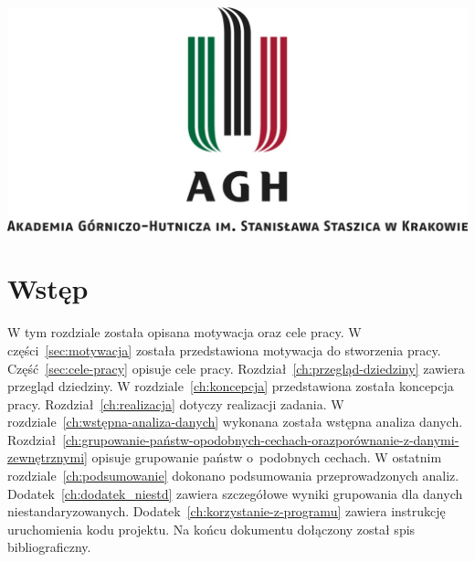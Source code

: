 \documentclass[11pt]{report}
\begin{document}
    \begin{titlepage}
        \centering
        \includegraphics[width=\linewidth]{fig/AGH.jpg}
        \vspace{0.03\textheight}
        \bigskip
        \vspace{0.2\textheight}
        \par

        \vspace{0.1\textheight}
    \end{titlepage}

    \tableofcontents


    \chapter{Wstęp}

    W tym rozdziale została opisana motywacja oraz cele pracy.
    W części~\ref{sec:motywacja} została przedstawiona motywacja do stworzenia pracy.
    Część~\ref{sec:cele-pracy} opisuje cele pracy.
    Rozdział~\ref{ch:przegląd-dziedziny} zawiera przegląd dziedziny.
    W rozdziale~\ref{ch:koncepcja} przedstawiona została koncepcja pracy.
    Rozdział~\ref{ch:realizacja} dotyczy realizacji zadania.
    W rozdziale~\ref{ch:wstępna-analiza-danych} wykonana została wstępna analiza danych.
    Rozdział~\ref{ch:grupowanie-państw-opodobnych-cechach-orazporównanie-z-danymi-zewnętrznymi} opisuje grupowanie państw o~podobnych cechach.
    W ostatnim rozdziale~\ref{ch:podsumowanie} dokonano podsumowania przeprowadzonych analiz.
    Dodatek~\ref{ch:dodatek_niestd} zawiera szczegółowe wyniki grupowania dla danych niestandaryzowanych.
    Dodatek~\ref{ch:korzystanie-z-programu} zawiera instrukcję uruchomienia kodu projektu.
    Na końcu dokumentu dołączony został spis bibliograficzny.
\end{document}
